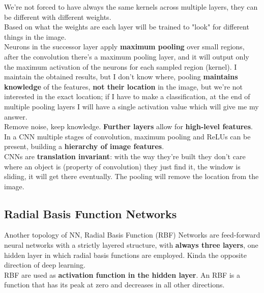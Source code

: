 \documentclass[11pt]{article}
\begin{document}
		We're not forced to have always the same kernels across multiple layers, they can be different with different weights.\\
		Based on what the weights are each layer will be trained to "look" for different things in the image.\\
		
		Neurons in the successor layer apply \textbf{maximum pooling} over small regions, after the convolution there's a maximum pooling layer, and it will output only the maximum activation of the neurons for each sampled region (kernel). I maintain the obtained results, but I don't know where, pooling \textbf{maintains knowledge} of the features, \textbf{not their location} in the image, but we're not interested in the exact location; if I have to make a classification, at the end of multiple pooling layers I will have a single activation value which will give me my answer. \\
		Remove noise, keep knowledge. \textbf{Further layers} allow for \textbf{high-level features}.\\
		
		In a CNN multiple stages of convolution, maximum pooling and ReLUs can be present, building a \textbf{hierarchy of image features}.\\
		
		CNNs are \textbf{translation invariant}: with the way they're built they don't care where an object is (property of convolution) they just find it, the window is sliding, it will get there eventually. The pooling will remove the location from the image.\\
		
		
		\newpage
		
		\subsection{Radial Basis Function Networks}
		Another topology of NN, Radial Basis Function (RBF) Networks are feed-forward neural networks with a strictly layered structure, with \textbf{always three layers}, one hidden layer in which radial basis functions are employed. Kinda the opposite direction of deep learning.\\
		
		RBF are used as \textbf{activation function in the hidden layer}. An RBF is a function that has its peak at zero and decreases in all other directions.\\
		
\end{document}
